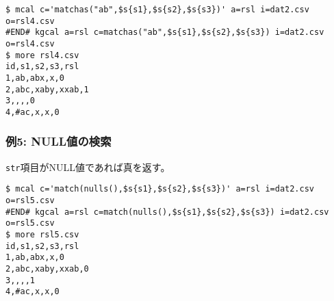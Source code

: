 \begin{Verbatim}[baselinestretch=0.7,frame=single]
$ mcal c='matchas("ab",$s{s1},$s{s2},$s{s3})' a=rsl i=dat2.csv o=rsl4.csv
#END# kgcal a=rsl c=matchas("ab",$s{s1},$s{s2},$s{s3}) i=dat2.csv o=rsl4.csv
$ more rsl4.csv
id,s1,s2,s3,rsl
1,ab,abx,x,0
2,abc,xaby,xxab,1
3,,,,0
4,#ac,x,x,0
\end{Verbatim}
\subsubsection*{例5: NULL値の検索}

\verb|str|項目がNULL値であれば真を返す。


\begin{Verbatim}[baselinestretch=0.7,frame=single]
$ mcal c='match(nulls(),$s{s1},$s{s2},$s{s3})' a=rsl i=dat2.csv o=rsl5.csv
#END# kgcal a=rsl c=match(nulls(),$s{s1},$s{s2},$s{s3}) i=dat2.csv o=rsl5.csv
$ more rsl5.csv
id,s1,s2,s3,rsl
1,ab,abx,x,0
2,abc,xaby,xxab,0
3,,,,1
4,#ac,x,x,0
\end{Verbatim}
